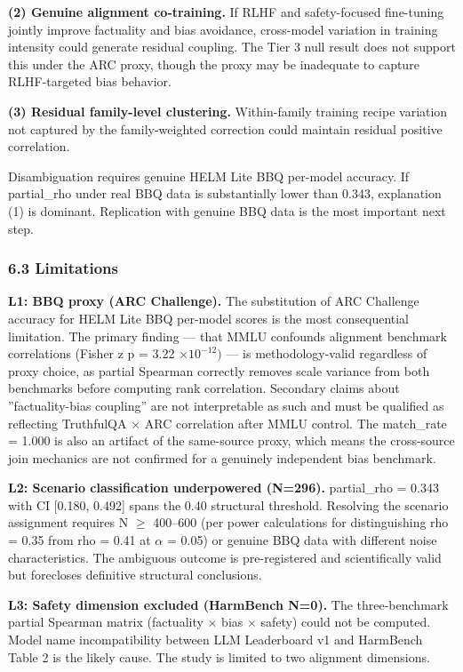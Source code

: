 \textbf{(2) Genuine alignment co-training.} If RLHF and safety-focused fine-tuning jointly improve factuality and bias avoidance, cross-model variation in training intensity could generate residual coupling. The Tier 3 null result does not support this under the ARC proxy, though the proxy may be inadequate to capture RLHF-targeted bias behavior.

\textbf{(3) Residual family-level clustering.} Within-family training recipe variation not captured by the family-weighted correction could maintain residual positive correlation.

Disambiguation requires genuine HELM Lite BBQ per-model accuracy. If partial\_rho under real BBQ data is substantially lower than 0.343, explanation (1) is dominant. Replication with genuine BBQ data is the most important next step.

\subsubsection{6.3 Limitations}

\textbf{L1: BBQ proxy (ARC Challenge).} The substitution of ARC Challenge accuracy for HELM Lite BBQ per-model scores is the most consequential limitation. The primary finding --- that MMLU confounds alignment benchmark correlations (Fisher z p = 3.22 $\times 10^{-12})$ --- is methodology-valid regardless of proxy choice, as partial Spearman correctly removes scale variance from both benchmarks before computing rank correlation. Secondary claims about ''factuality-bias coupling'' are not interpretable as such and must be qualified as reflecting TruthfulQA $\times$ ARC correlation after MMLU control. The match\_rate = 1.000 is also an artifact of the same-source proxy, which means the cross-source join mechanics are not confirmed for a genuinely independent bias benchmark.

\textbf{L2: Scenario classification underpowered (N=296).} partial\_rho = 0.343 with CI [0.180, 0.492] spans the 0.40 structural threshold. Resolving the scenario assignment requires N $\geq$ 400--600 (per power calculations for distinguishing rho = 0.35 from rho = 0.41 at $\alpha$ = 0.05) or genuine BBQ data with different noise characteristics. The ambiguous outcome is pre-registered and scientifically valid but forecloses definitive structural conclusions.

\textbf{L3: Safety dimension excluded (HarmBench N=0).} The three-benchmark partial Spearman matrix (factuality $\times$ bias $\times$ safety) could not be computed. Model name incompatibility between LLM Leaderboard v1 and HarmBench Table 2 is the likely cause. The study is limited to two alignment dimensions.

